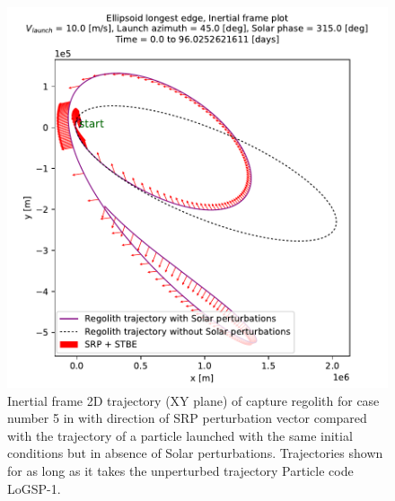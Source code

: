 \begin{figure}[htb]
\centering
\captionsetup{justification=centering}
\includegraphics[width=\textwidth, height=0.5\textheight, keepaspectratio=true]{longest_edge_perturbations/3.2Density_1cmSize/singlePlot_comparative_PerturbationVector_10ms_45Azimuth_315SolarPhase_inertialFrame.pdf}
\caption{Inertial frame 2D trajectory (XY plane) of capture regolith for case number 5 in  with direction of \gls{SRP} perturbation vector compared with the trajectory of a particle launched with the same initial conditions but in absence of Solar perturbations. Trajectories shown for as long as it takes the unperturbed trajectory Particle code LoGSP-1.}
\label{fig:LoGSP_1_capture_case_5_2d_trajectory_comparative_inertialFrame}
\end{figure}
\FloatBarrier
